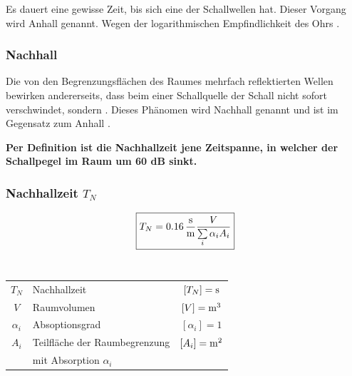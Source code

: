 Es dauert eine gewisse Zeit, bis sich eine  der Schallwellen  hat. Dieser Vorgang wird Anhall genannt. Wegen der logarithmischen Empfindlichkeit des Ohrs .

\subsubsection{Nachhall}

Die von den Begrenzungsflächen des Raumes mehrfach reflektierten Wellen bewirken andererseits, dass beim  einer Schallquelle der Schall nicht sofort verschwindet, sondern . Dieses Phänomen wird Nachhall genannt und ist im Gegensatz zum Anhall . \\
\vspace{0.2cm}

\textbf{Per Definition ist die Nachhallzeit jene Zeitspanne, in welcher der Schallpegel im Raum um 60 dB sinkt.}


\subsubsection{Nachhallzeit $T_N$}


$$ \boxed{ T_N = 0.16 \, \frac{\mathrm{s}}{\mathrm{m}} \frac{V}{\sum\limits_i \alpha_i A_i } } $$ \\

\begin{tabular}{clc}
$T_N$ & Nachhallzeit & $[T_N] = \mathrm{s}$ \\
$V$ & Raumvolumen & $[V] = \mathrm{m}^3$ \\
$\alpha_i$ & Absoptionsgrad & $[\alpha_i] = 1$ \\
$A_i$ & Teilfläche der Raumbegrenzung & $[A_i] = \mathrm{m}^2$ \\ 
& mit Absorption $\alpha_i$ \\
\end{tabular}

